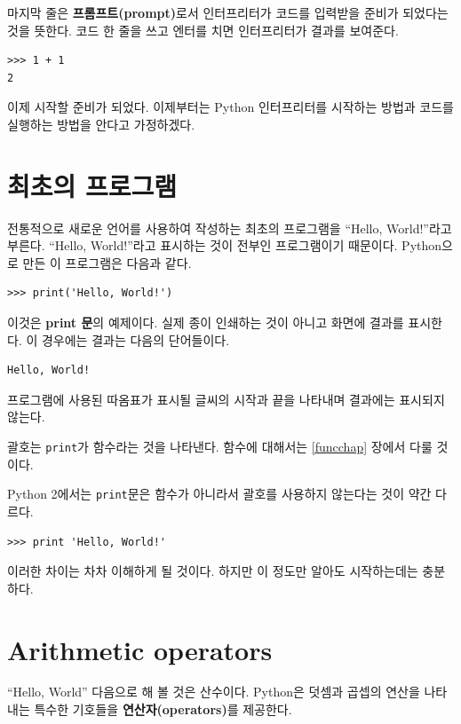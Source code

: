\documentclass[10pt]{book}
\begin{document}
마지막 줄은 {\bf 프롬프트(prompt)}로서 인터프리터가 코드를 입력받을
준비가 되었다는 것을 뜻한다.  코드 한 줄을 쓰고 엔터를 치면
인터프리터가 결과를 보여준다.

\begin{verbatim}
>>> 1 + 1
2
\end{verbatim}
%
이제 시작할 준비가 되었다.  이제부터는 Python 인터프리터를 시작하는
방법과 코드를 실행하는 방법을 안다고 가정하겠다.


\section{최초의 프로그램}
\label{hello}

전통적으로 새로운 언어를 사용하여 작성하는 최초의 프로그램을 ``Hello,
World!''라고 부른다.  ``Hello, World!''라고 표시하는 것이 전부인 프로그램이기 때문이다. Python으로 만든 이 프로그램은 다음과 같다. 


\begin{verbatim}
>>> print('Hello, World!')
\end{verbatim}
%
이것은 {\bf print 문}의 예제이다. 실제 종이 인쇄하는 것이 아니고
화면에 결과를 표시한다.  이 경우에는 결과는 다음의 단어들이다.

\begin{verbatim}
Hello, World!
\end{verbatim}
%
프로그램에 사용된 따옴표가 표시될 글씨의 시작과 끝을 나타내며 결과에는
표시되지 않는다.

괄호는 {\tt print}가 함수라는 것을 나타낸다.  함수에 대해서는
\ref{funcchap} 장에서 다룰 것이다.
 

Python 2에서는 \texttt{print}문은 함수가 아니라서 괄호를 사용하지
않는다는 것이 약간 다르다.

\begin{verbatim}
>>> print 'Hello, World!'
\end{verbatim}
%
이러한 차이는 차차 이해하게 될 것이다. 하지만 이 정도만 알아도
시작하는데는 충분하다.


\section{Arithmetic operators}

``Hello, World'' 다음으로 해 볼 것은 산수이다.  Python은 덧셈과 곱셉의
연산을 나타내는 특수한 기호들을 {\bf 연산자(operators)}를 제공한다.
\end{document}
